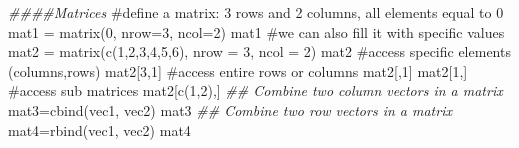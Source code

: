 \documentclass[
  letterpaper,
  DIV=11,
  numbers=noendperiod]{scrreprt}
\newenvironment{Shaded}{\begin{snugshade}}{\end{snugshade}}
\newcommand{\AttributeTok}[1]{\textcolor[rgb]{0.40,0.45,0.13}{#1}}
\newcommand{\CommentTok}[1]{\textcolor[rgb]{0.37,0.37,0.37}{#1}}
\newcommand{\DecValTok}[1]{\textcolor[rgb]{0.68,0.00,0.00}{#1}}
\newcommand{\DocumentationTok}[1]{\textcolor[rgb]{0.37,0.37,0.37}{\textit{#1}}}
\newcommand{\FunctionTok}[1]{\textcolor[rgb]{0.28,0.35,0.67}{#1}}
\newcommand{\NormalTok}[1]{\textcolor[rgb]{0.00,0.23,0.31}{#1}}
\newcommand{\OtherTok}[1]{\textcolor[rgb]{0.00,0.23,0.31}{#1}}
\begin{document}
\begin{Shaded}
\begin{Highlighting}[]
\DocumentationTok{\#\#\#\#Matrices}
\CommentTok{\#define a matrix: 3 rows and 2 columns, all elements equal to 0}
\NormalTok{mat1 }\OtherTok{=} \FunctionTok{matrix}\NormalTok{(}\DecValTok{0}\NormalTok{, }\AttributeTok{nrow=}\DecValTok{3}\NormalTok{, }\AttributeTok{ncol=}\DecValTok{2}\NormalTok{)}
\NormalTok{mat1}
\CommentTok{\#we can also fill it with specific values}
\NormalTok{mat2 }\OtherTok{=} \FunctionTok{matrix}\NormalTok{(}\FunctionTok{c}\NormalTok{(}\DecValTok{1}\NormalTok{,}\DecValTok{2}\NormalTok{,}\DecValTok{3}\NormalTok{,}\DecValTok{4}\NormalTok{,}\DecValTok{5}\NormalTok{,}\DecValTok{6}\NormalTok{), }\AttributeTok{nrow =} \DecValTok{3}\NormalTok{, }\AttributeTok{ncol =} \DecValTok{2}\NormalTok{)}
\NormalTok{mat2}
\CommentTok{\#access specific elements (columns,rows)}
\NormalTok{mat2[}\DecValTok{3}\NormalTok{,}\DecValTok{1}\NormalTok{]}
\CommentTok{\#access entire rows or columns}
\NormalTok{mat2[,}\DecValTok{1}\NormalTok{]}
\NormalTok{mat2[}\DecValTok{1}\NormalTok{,]}
\CommentTok{\#access sub matrices}
\NormalTok{mat2[}\FunctionTok{c}\NormalTok{(}\DecValTok{1}\NormalTok{,}\DecValTok{2}\NormalTok{),]}
\DocumentationTok{\#\# Combine two column vectors in a matrix}
\NormalTok{mat3}\OtherTok{=}\FunctionTok{cbind}\NormalTok{(vec1, vec2)}
\NormalTok{mat3}
\DocumentationTok{\#\# Combine two row vectors in a matrix}
\NormalTok{mat4}\OtherTok{=}\FunctionTok{rbind}\NormalTok{(vec1, vec2)}
\NormalTok{mat4}
\end{Highlighting}
\end{Shaded}
\end{document}

